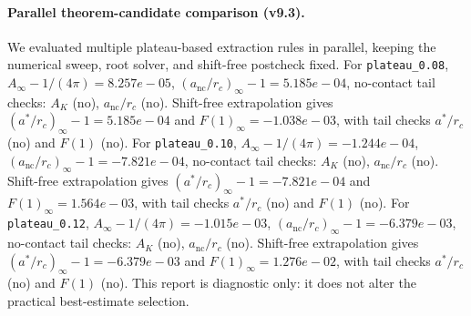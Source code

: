 \paragraph{Parallel theorem-candidate comparison (v9.3).}
We evaluated multiple plateau-based extraction rules in parallel, keeping the numerical sweep, root solver, and shift-free postcheck fixed. For \texttt{plateau_0.08}, $A_\infty-1/(4\pi)=8.257e-05$, $(a_{\mathrm{nc}}/r_c)_\infty-1=5.185e-04$, no-contact tail checks: $A_K$ (no), $a_{\mathrm{nc}}/r_c$ (no). Shift-free extrapolation gives $(a^*/r_c)_\infty-1=5.185e-04$ and $F(1)_\infty=-1.038e-03$, with tail checks $a^*/r_c$ (no) and $F(1)$ (no). For \texttt{plateau_0.10}, $A_\infty-1/(4\pi)=-1.244e-04$, $(a_{\mathrm{nc}}/r_c)_\infty-1=-7.821e-04$, no-contact tail checks: $A_K$ (no), $a_{\mathrm{nc}}/r_c$ (no). Shift-free extrapolation gives $(a^*/r_c)_\infty-1=-7.821e-04$ and $F(1)_\infty=1.564e-03$, with tail checks $a^*/r_c$ (no) and $F(1)$ (no). For \texttt{plateau_0.12}, $A_\infty-1/(4\pi)=-1.015e-03$, $(a_{\mathrm{nc}}/r_c)_\infty-1=-6.379e-03$, no-contact tail checks: $A_K$ (no), $a_{\mathrm{nc}}/r_c$ (no). Shift-free extrapolation gives $(a^*/r_c)_\infty-1=-6.379e-03$ and $F(1)_\infty=1.276e-02$, with tail checks $a^*/r_c$ (no) and $F(1)$ (no). This report is diagnostic only: it does not alter the practical best-estimate selection.
